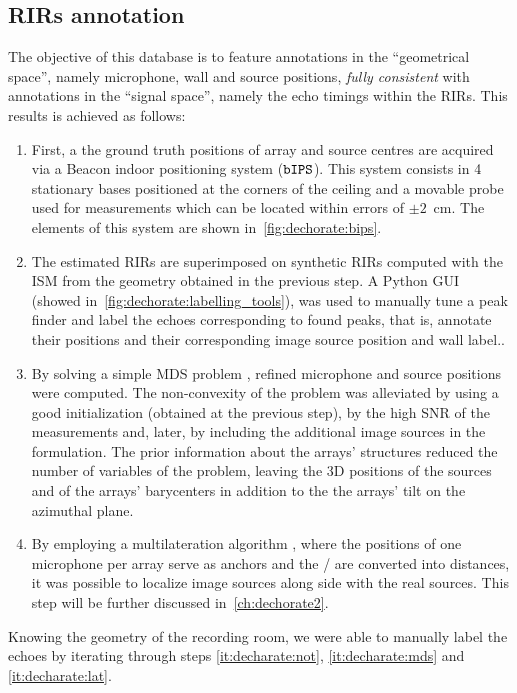 \subsection{RIRs annotation}
The objective of this database is to feature annotations in the ``geometrical space'', namely microphone, wall and source positions, \textit{fully consistent} with annotations in the ``signal space'', namely the echo timings within the \acp{RIR}.
This results is achieved as follows:
\begin{enumerate}[label=(\roman*)]
    \item \label{it:decharate:ips} First, a the ground truth positions of array and source centres are acquired via a Beacon indoor positioning system ($\mathtt{bIPS}$).
    This system consists in 4 stationary bases positioned at the corners of the ceiling and a movable probe used for measurements which can be located within errors of $\pm2$~cm.
    The elements of this system are shown in~\cref{fig:dechorate:bips}.
    \item \label{it:decharate:not} The estimated \acp{RIR} are superimposed on synthetic \acp{RIR} computed with the \acf{ISM} from the geometry obtained in the previous step.
    A Python GUI (showed in~\cref{fig:dechorate:labelling_tools}), was used to manually tune a peak finder and label the echoes corresponding to found peaks, that is, annotate their positions and their corresponding image source position and wall label..

    \item \label{it:decharate:mds} By solving a simple \acf{MDS} problem , refined microphone and source positions were computed.
    The non-convexity of the problem was alleviated by using a good initialization (obtained at the previous step), by the high SNR of the measurements and, later, by including the additional image sources in the formulation.
    The prior information about the arrays' structures reduced the number of variables of the problem, leaving the 3D positions of the sources and of the arrays' barycenters in addition to the the arrays' tilt on the azimuthal plane.

    \item \label{it:decharate:lat} By employing a multilateration algorithm , where the positions of one microphone per array serve as anchors and the \TOAs/ are converted into distances, it was possible to localize image sources along side with the real sources.
    This step will be further discussed in~\cref{ch:dechorate2}.
\end{enumerate}
Knowing the geometry of the recording room, we were able to manually label the echoes by iterating through steps \ref{it:decharate:not}, \ref{it:decharate:mds} and \ref{it:decharate:lat}.

